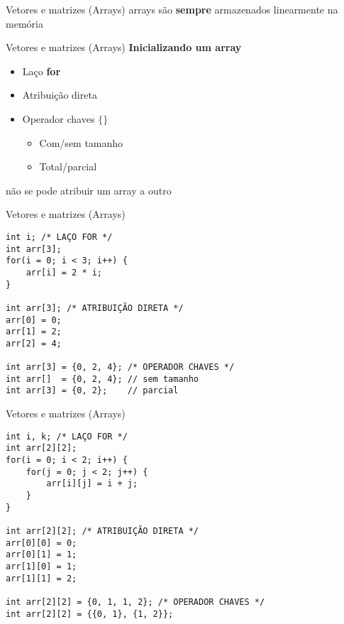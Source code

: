 \documentclass[10pt]{beamer}
\begin{document}
\begin{frame}{Vetores e matrizes (Arrays)}
    \huge
    arrays são \textbf{sempre} armazenados linearmente na memória
\end{frame}

\begin{frame}[fragile]{Vetores e matrizes (Arrays)}
    \huge
    \textbf{Inicializando um array}
    
    \begin{itemize}
        \item Laço \textbf{for}
        \item Atribuição direta
        \item Operador chaves $\{ \}$

        \begin{itemize}
            \Large
            \item Com/sem tamanho
            \item Total/parcial
        \end{itemize}
    \end{itemize}
    
    \Large
    
    não se pode atribuir um array a outro \faExclamationTriangle
\end{frame}

\begin{frame}[fragile]{Vetores e matrizes (Arrays)}
    \begin{verbatim}
int i; /* LAÇO FOR */
int arr[3];
for(i = 0; i < 3; i++) {
    arr[i] = 2 * i;
}

int arr[3]; /* ATRIBUIÇÃO DIRETA */
arr[0] = 0;
arr[1] = 2;
arr[2] = 4;

int arr[3] = {0, 2, 4}; /* OPERADOR CHAVES */
int arr[]  = {0, 2, 4}; // sem tamanho
int arr[3] = {0, 2};    // parcial
    \end{verbatim}
\end{frame}

\begin{frame}[fragile]{Vetores e matrizes (Arrays)}
    \begin{verbatim}
int i, k; /* LAÇO FOR */
int arr[2][2];
for(i = 0; i < 2; i++) {
    for(j = 0; j < 2; j++) {
        arr[i][j] = i + j;
    }
}

int arr[2][2]; /* ATRIBUIÇÃO DIRETA */
arr[0][0] = 0;
arr[0][1] = 1;
arr[1][0] = 1;
arr[1][1] = 2;

int arr[2][2] = {0, 1, 1, 2}; /* OPERADOR CHAVES */
int arr[2][2] = {{0, 1}, {1, 2}};
    \end{verbatim}
\end{frame}
\end{document}
